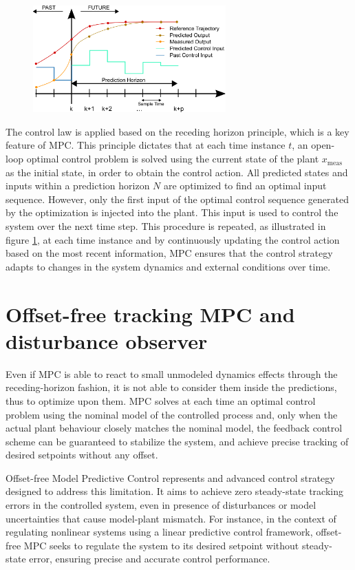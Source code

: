 \documentclass[a4paper,12pt,oneside]{book}
\begin{document}
\begin{figure}
	\centering
	\includegraphics[width=0.66\textwidth]{MPC.png}
\label{mpc}
\end{figure}

\bigskip
The control law is applied based on the receding horizon principle, which is a key feature of MPC.
This principle dictates that at each time instance $t$, an open-loop optimal control problem is solved using the current state of the plant $x_{\text{meas}}$ as the initial state, in order to obtain the control action. 
All predicted states and inputs within a prediction horizon $N$ are optimized to find an optimal input sequence.
However, only the first input of the optimal control sequence generated by the optimization is injected into the plant. 
This input is used to control the system over the next time step.
This procedure is repeated, as illustrated in figure \ref{mpc}, at each time instance and by continuously updating the control action based on the most recent information, MPC ensures that the control strategy adapts to changes in the system dynamics and external conditions over time.




\section{Offset-free tracking MPC and disturbance observer}
Even if MPC is able to react to small unmodeled dynamics effects through the receding-horizon fashion, it is not able to consider them inside the predictions, thus to optimize upon them.
MPC solves at each time an optimal control problem using the nominal model of the controlled process and, only when the actual plant behaviour closely matches the nominal model, the feedback control scheme can be guaranteed to stabilize the system, and achieve precise tracking of desired setpoints without any offset.

Offset-free Model Predictive Control represents and advanced control strategy designed to address this limitation. It aims to achieve zero steady-state tracking errors in the controlled system, even in presence of disturbances or model uncertainties that cause model-plant mismatch.
For instance, in the context of regulating nonlinear systems using a linear predictive control framework, offset-free MPC seeks to regulate the system to its desired setpoint without steady-state error, ensuring precise and accurate control performance.
\end{document}
